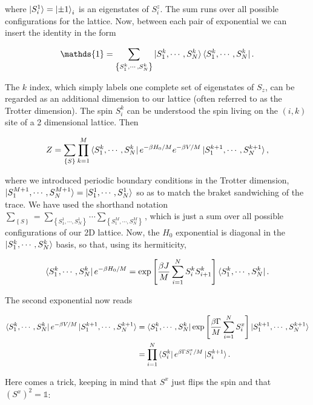 \documentclass[11pt,openany]{article}
\begin{document}
where $\ket{S_i^1} = \ket{\pm1}_i$ is an eigenstates of $S_i^z$. The sum runs over all possible configurations for the lattice. Now, between each pair of exponential we can insert the identity in the form

\begin{equation}
	\mathds{1} = \sum_{\left\{S^k_1,\cdots,S^k_N\right\}}\ket{S^k_1,\cdots,S^k_N}\bra{S^k_1,\cdots,S^k_N}.
\end{equation}

The $k$ index, which simply labels one complete set of eigenstates of $S_z$, can be regarded as an additional dimension to our lattice (often referred to as the Trotter dimension). The spin $S_i^k$ can be understood the spin living on the $(i,k)$ site of a 2 dimensional lattice. Then

\begin{equation}
	Z = \sum_{\left\{S\right\}}\prod_{k=1}^M\bra{S^k_1,\cdots,S^k_N}e^{-\beta H_0/M}e^{-\beta V/M}\ket{S^{k+1}_1,\cdots,S^{k+1}_N},
\end{equation}

where we introduced periodic boundary conditions in the Trotter dimension, $\ket{S^{M+1}_1,\cdots,S^{M+1}_N} = \ket{S^1_1,\cdots,S^1_N}$ so as to match the braket sandwiching of the trace. We have used the shorthand notation $\sum_{\left\{S\right\}} = \sum_{\left\{S_1^1,\cdots,S_N^1\right\}}\cdots\sum_{\left\{S_1^M,\cdots,S_N^M\right\}}$, which is just a sum over all possible configurations of our 2D lattice. Now, the $H_0$ exponential is diagonal in the $\ket{S^k_1,\cdots,S^k_N}$ basis, so that, using its hermiticity,

\begin{equation}
	\bra{S^k_1,\cdots,S^k_N}e^{-\beta H_0/M} = \exp\left[\frac{\beta J}{M}\sum_{i=1}^N S_i^k S_{i+1}^k\right]\bra{S^k_1,\cdots,S^k_N}.
\end{equation}

The second exponential now reads

\begin{align*}
	\bra{S^k_1,\cdots,S^k_N}e^{-\beta V/M}\ket{S^{k+1}_1,\cdots,S^{k+1}_N} &= \bra{S^k_1,\cdots,S^k_N}\exp\left[\frac{\beta\Gamma}{M}\sum_{i=1}^N S_i^x\right]\ket{S^{k+1}_1,\cdots,S^{k+1}_N}\\
	&= \prod_{i=1}^N\bra{S_i^k}e^{\beta\Gamma S_i^x/M}\ket{S_i^{k+1}}.
\end{align*}

Here comes a trick, keeping in mind that $S^x$ just flips the spin and that $(S^x)^2=\mathds{1}$:
\end{document}
